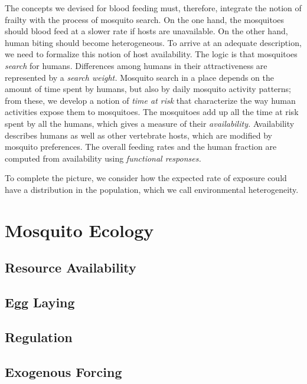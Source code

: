 \documentclass[
]{book}
\begin{document}
The concepts we devised for blood feeding must, therefore, integrate the notion of frailty with the process of mosquito search. On the one hand, the mosquitoes should blood feed at a slower rate if hosts are unavailable. On the other hand, human biting should become heterogeneous. To arrive at an adequate description, we need to formalize this notion of host availability.
The logic is that mosquitoes \emph{search} for humans. Differences among humans in their attractiveness are represented by a \emph{search weight.} Mosquito search in a place depends on the amount of time spent by humans, but also by daily mosquito activity patterns; from these, we develop a notion of \emph{time at risk} that characterize the way human activities expose them to mosquitoes. The mosquitoes add up all the time at risk spent by all the humans, which gives a measure of their \emph{availability.} Availability describes humans as well as other vertebrate hosts, which are modified by mosquito preferences. The overall feeding rates and the human fraction are computed from availability using \emph{functional responses.}

To complete the picture, we consider how the expected rate of exposure could have a distribution in the population, which we call environmental heterogeneity.

\section{Mosquito Ecology}\label{mosquito-ecology-3}

\subsection{Resource Availability}\label{resource-availability}

\subsection{Egg Laying}\label{egg-laying-1}

\subsection{Regulation}\label{regulation}

\subsection{Exogenous Forcing}\label{exogenous-forcing}
\end{document}
